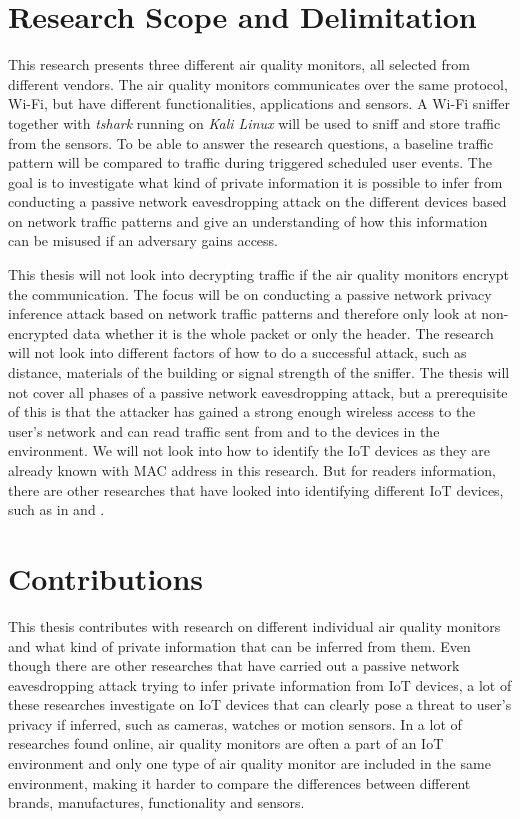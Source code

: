 \section{Research Scope and Delimitation}
This research presents three different air quality monitors, all selected from different vendors. The air quality monitors communicates over the same protocol, \gls{Wi-Fi}, but have different functionalities, applications and sensors. A \gls{Wi-Fi} sniffer together with \textit{tshark} running on \textit{Kali Linux} will be used to sniff and store traffic from the sensors. To be able to answer the research questions, a baseline traffic pattern will be compared to traffic during triggered scheduled user events. The goal is to investigate what kind of private information it is possible to infer from conducting a passive network eavesdropping attack on the different devices based on network traffic patterns and give an understanding of how this information can be misused if an adversary gains access. 

This thesis will not look into decrypting traffic if the air quality monitors encrypt the communication. The focus will be on conducting a passive network privacy inference attack based on network traffic patterns and therefore only look at non-encrypted data whether it is the whole packet or only the header. The research will not look into different factors of how to do a successful attack, such as distance, materials of the building or signal strength of the sniffer. The thesis will not cover all phases of a passive network eavesdropping attack, but a prerequisite of this is that the attacker has gained a strong enough wireless access to the user's network and can read traffic sent from and to the devices in the environment. We will not look into how to identify the \gls{IoT} devices as they are already known with \gls{MAC} address in this research. But for readers information, there are other researches that have looked into identifying different \gls{IoT} devices, such as in \cite{IdentifyIoT1} and \cite{IdentifyingIoT2}. 

\section{Contributions}
This thesis contributes with research on different individual air quality monitors and what kind of private information that can be inferred from them. Even though there are other researches that have carried out a passive network eavesdropping attack trying to infer private information from \gls{IoT} devices, a lot of these researches investigate on \gls{IoT} devices that can clearly pose a threat to user's privacy if inferred, such as cameras, watches or motion sensors. In a lot of researches found online, air quality monitors are often a part of an \gls{IoT} environment and only one type of air quality monitor are included in the same environment, making it harder to compare the differences between different brands, manufactures, functionality and sensors. 

